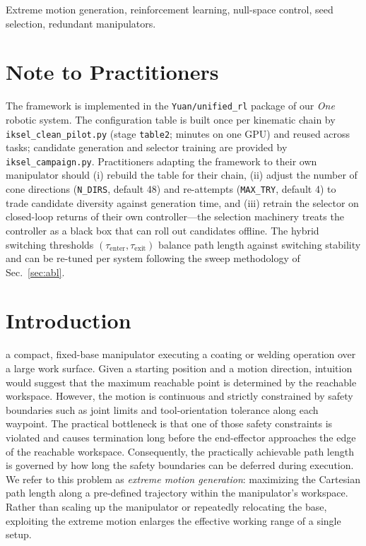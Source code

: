 \documentclass[journal]{IEEEtran}
\begin{document}
\begin{IEEEkeywords}
Extreme motion generation, reinforcement learning, null-space control,
seed selection, redundant manipulators.
\end{IEEEkeywords}

\section*{Note to Practitioners}
The framework is implemented in the \texttt{Yuan/unified\_rl} package of
our \textit{One} robotic system. The configuration table is built once
per kinematic chain by \texttt{iksel\_clean\_pilot.py} (stage
\texttt{table2}; minutes on one GPU) and reused across tasks; candidate
generation and selector training are provided by
\texttt{iksel\_campaign.py}. Practitioners adapting the framework to
their own manipulator should (i) rebuild the table for their chain,
(ii) adjust the number of cone directions (\texttt{N\_DIRS}, default 48)
and re-attempts (\texttt{MAX\_TRY}, default 4) to trade candidate
diversity against generation time, and (iii) retrain the selector on
closed-loop returns of their own controller---the selection machinery
treats the controller as a black box that can roll out candidates
offline. The hybrid switching thresholds
$(\tau_{\mathrm{enter}},\tau_{\mathrm{exit}})$ balance path length
against switching stability and can be re-tuned per system following the
sweep methodology of Sec.~\ref{sec:abl}.

\section{Introduction}
 a compact, fixed-base manipulator executing a
coating or welding operation over a large work surface. Given a starting
position and a motion direction, intuition would suggest that the
maximum reachable point is determined by the reachable workspace.
However, the motion is continuous and strictly constrained by safety
boundaries such as joint limits and tool-orientation tolerance along
each waypoint. The practical bottleneck is that one of those safety
constraints is violated and causes termination long before the
end-effector approaches the edge of the reachable workspace.
Consequently, the practically achievable path length is governed by how
long the safety boundaries can be deferred during execution. We refer to
this problem as \textit{extreme motion generation}: maximizing the
Cartesian path length along a pre-defined trajectory within the
manipulator's workspace. Rather than scaling up the manipulator or
repeatedly relocating the base, exploiting the extreme motion enlarges
the effective working range of a single setup.
\end{document}
